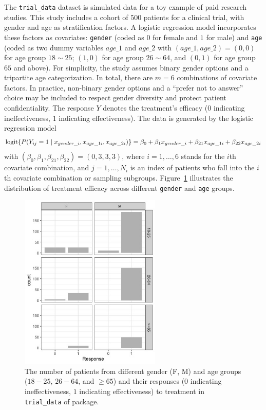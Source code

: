The \texttt{trial\_data} dataset is simulated data for a toy example of paid research studies. This study includes a cohort of $500$ patients for a clinical trial, with gender and age as stratification factors. A logistic regression model incorporates these factors as covariates: {\tt gender} (coded as $0$ for female and $1$ for male) and {\tt age} (coded as two dummy variables $age\_1$ and $age\_2$ with $(age\_1, age\_2) = (0, 0)$ for age group $18\sim25$; $(1, 0)$ for age group $26\sim64$, and $(0, 1)$ for age group $65$ and above). For simplicity, the study assumes binary gender options and a tripartite age categorization. In total, there are $m=6$ combinations of covariate factors. In practice, non-binary gender options and a ``prefer not to answer'' choice may be included to respect gender diversity and protect patient confidentiality. The response $Y$ denotes the treatment's efficacy ($0$ indicating ineffectiveness, $1$ indicating effectiveness). The data is generated by the logistic regression model
\begin{equation}\label{eq:trial_logistic_model}
  {\rm logit} \{P(Y_{ij}=1 \mid x_{gender\_i}, x_{age\_1i}, x_{age\_2i})\} = \beta_0 + \beta_1 x_{gender\_i} + \beta_{21} x_{age\_1i} + \beta_{22} x_{age\_2i}
\end{equation}
with $(\beta_0, \beta_1, \beta_{21}, \beta_{22}) = (0,3,3,3)$, where $i=1, \ldots, 6$ stands for the $i$th covariate combination, and $j = 1, \ldots, N_i$ is an index of patients who fall into the $i$th covariate combination or sampling subgroups. Figure~\ref{fig:trial_data} illustrates the distribution of treatment efficacy across different {\tt gender} and {\tt age} groups.

\begin{figure}[htb!]
  \centering
  \includegraphics[width=0.6\textwidth]{figures/trial_data.png}
  \caption{The number of patients from different gender (F, M) and age groups ($18-25$, $26-64$, and $\ge 65$) and their responses  ($0$ indicating ineffectiveness, $1$ indicating effectiveness) to treatment in \texttt{trial\_data} of  package.}
  \label{fig:trial_data}
\end{figure}

